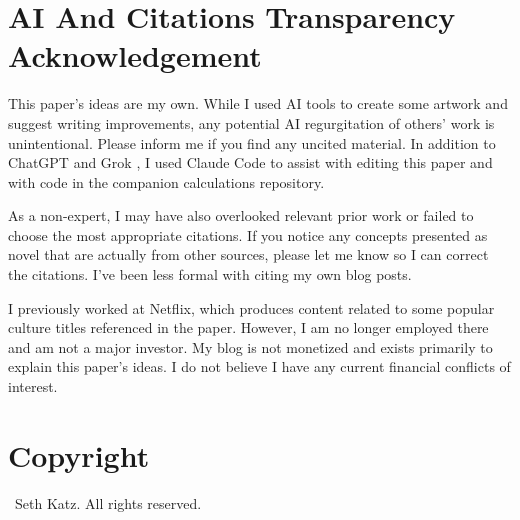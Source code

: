 \documentclass{article}
\begin{document}
 \section{AI And Citations Transparency Acknowledgement}
 This paper's ideas are my own. While I used AI tools to create some artwork and suggest writing improvements, any potential AI regurgitation of others' work is unintentional. Please inform me if you find any uncited material. In addition to ChatGPT \cite{chatgpt} and Grok \cite{grok}, I used Claude Code \cite{claude_code} to assist with editing this paper and with code in the companion calculations repository.

As a non-expert, I may have also overlooked relevant prior work or failed to choose the most appropriate citations. If you notice any concepts presented as novel that are actually from other sources, please let me know so I can correct the citations. I've been less formal with citing my own blog posts.

I previously worked at Netflix, which produces content related to some popular culture titles referenced in the paper. However, I am no longer employed there and am not a major investor. My blog is not monetized and exists primarily to explain this paper's ideas. I do not believe I have any current financial conflicts of interest.

\section{Copyright}
\small
\textcopyright\ Seth Katz. All rights reserved.

 
\printbibliography 
\end{document}
